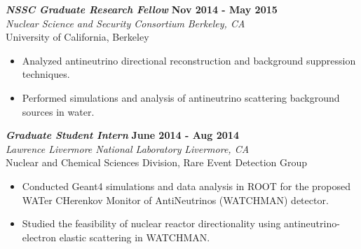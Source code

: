 \documentclass[margin, 10pt]{style/res} %
\begin{document}
\begin{resume}
{\sl\bf NSSC Graduate Research Fellow} \hfill {\bf Nov 2014 - May 2015} \\
{\sl Nuclear Science and Security Consortium} \hfill {\sl Berkeley, CA}\\
University of California, Berkeley
\vspace{2pt}
\begin{itemize}[leftmargin=4ex] \itemsep -2pt
\item Analyzed antineutrino directional reconstruction and background suppression techniques.
\item Performed simulations and analysis of antineutrino scattering background sources in water.
\end{itemize} 
 
{\sl\bf Graduate Student Intern} \hfill {\bf June 2014 - Aug 2014} \\
{\sl Lawrence Livermore National Laboratory} \hfill {\sl Livermore, CA}\\
Nuclear and Chemical Sciences Division, Rare Event Detection Group
\vspace{2pt}
\begin{itemize}[leftmargin=4ex] \itemsep -2pt
\item Conducted Geant4 simulations and data analysis in ROOT for the proposed WATer CHerenkov Monitor of AntiNeutrinos (WATCHMAN) detector.
\item Studied the feasibility of nuclear reactor directionality using antineutrino-electron elastic scattering in WATCHMAN.
\end{itemize}


\end{resume}
\end{document}
